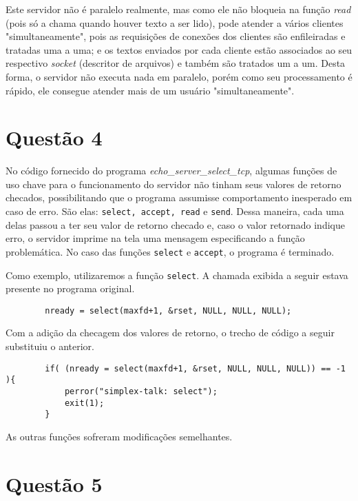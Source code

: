 \documentclass[a4paper,10pt]{article}
\begin{document}
Este servidor não é paralelo realmente, mas como ele não bloqueia na função \textit{read} (pois só a chama quando houver texto a ser lido), pode atender a vários clientes "simultaneamente", pois as requisições de conexões dos clientes são enfileiradas e tratadas uma a uma; e os textos enviados por cada cliente estão associados ao seu respectivo \textit{socket} (descritor de arquivos) e também são tratados um a um. Desta forma, o servidor não executa nada em paralelo, porém como seu processamento é rápido, ele consegue atender mais de um usuário "simultaneamente".

\section{Questão 4}

No código fornecido do programa \textit{echo\_server\_select\_tcp}, algumas funções de uso chave para o funcionamento do servidor não tinham seus valores de retorno checados, possibilitando que o programa assumisse comportamento inesperado em caso de erro. São elas: {\tt select, accept, read} e {\tt send}. Dessa maneira, cada uma delas passou a ter seu valor de retorno checado e, caso o valor retornado indique erro, o servidor imprime na tela uma mensagem especificando a função problemática. No caso das funções {\tt select} e {\tt accept}, o programa é terminado.

Como exemplo, utilizaremos a função {\tt select}. A chamada exibida a seguir estava presente no programa original.

\begin{lstlisting}
		nready = select(maxfd+1, &rset, NULL, NULL, NULL);
\end{lstlisting} 

Com a adição da checagem dos valores de retorno, o trecho de código a seguir substituiu o anterior.

\begin{lstlisting}
		if( (nready = select(maxfd+1, &rset, NULL, NULL, NULL)) == -1 ){
			perror("simplex-talk: select");
			exit(1);
		}

\end{lstlisting}

As outras funções sofreram modificações semelhantes.


\section{Questão 5}
\end{document}
